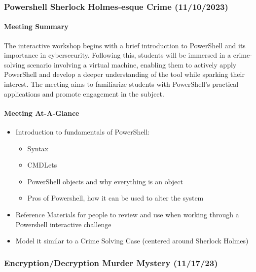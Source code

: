 \documentclass[
  letterpaper,
  DIV=11,
  numbers=noendperiod]{scrartcl}
\let\oldparagraph\paragraph
\renewcommand{\paragraph}[1]{\oldparagraph{#1}\mbox{}}
\providecommand{\tightlist}{%
  \setlength{\itemsep}{0pt}\setlength{\parskip}{0pt}}\usepackage{longtable,booktabs,array}
\begin{document}
\newpage{}

\hypertarget{powershell-sherlock-holmes-esque-crime-11102023}{%
\subsubsection{Powershell Sherlock Holmes-esque Crime
(11/10/2023)}\label{powershell-sherlock-holmes-esque-crime-11102023}}

\hypertarget{meeting-summary-8}{%
\paragraph{Meeting Summary}\label{meeting-summary-8}}

The interactive workshop begins with a brief introduction to PowerShell
and its importance in cybersecurity. Following this, students will be
immersed in a crime-solving scenario involving a virtual machine,
enabling them to actively apply PowerShell and develop a deeper
understanding of the tool while sparking their interest. The meeting
aims to familiarize students with PowerShell's practical applications
and promote engagement in the subject.

\hypertarget{meeting-at-a-glance-8}{%
\paragraph{Meeting At-A-Glance}\label{meeting-at-a-glance-8}}

\begin{itemize}
\tightlist
\item
  Introduction to fundamentals of PowerShell:

  \begin{itemize}
  \tightlist
  \item
    Syntax
  \item
    CMDLets
  \item
    PowerShell objects and why everything is an object
  \item
    Pros of Powershell, how it can be used to alter the system
  \end{itemize}
\item
  Reference Materials for people to review and use when working through
  a Powershell interactive challenge
\item
  Model it similar to a Crime Solving Case (centered around Sherlock
  Holmes)
\end{itemize}

\hypertarget{encryptiondecryption-murder-mystery-111723}{%
\subsubsection{Encryption/Decryption Murder Mystery
(11/17/23)}\label{encryptiondecryption-murder-mystery-111723}}
\end{document}
